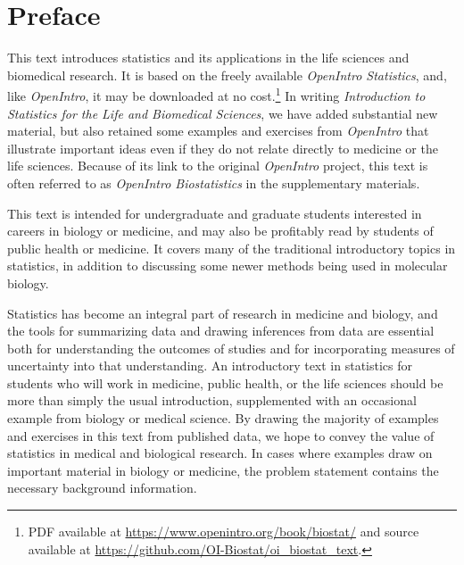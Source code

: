 

\chapter*{Preface}

This text introduces statistics and its applications in the life sciences and biomedical research.  It is based on the freely available \textit{OpenIntro Statistics}, and, like \textit{OpenIntro}, it may be downloaded at no cost.\footnote{PDF available at \url{https://www.openintro.org/book/biostat/} and source available at \url{https://github.com/OI-Biostat/oi_biostat_text}.}  In writing \textit{Introduction to Statistics for the Life and Biomedical Sciences}, we have added substantial new material, but also retained some examples and exercises from \textit{OpenIntro} that illustrate important ideas even if they do not relate directly to medicine or the life sciences. Because of its link to the original \textit{OpenIntro} project, this text is often referred to as \textit{OpenIntro Biostatistics} in the supplementary materials.

This text is intended for undergraduate and graduate students interested in careers in biology or medicine, and may also be profitably read by students of public health or medicine.  It covers many of the traditional introductory topics in statistics, in addition to discussing some newer methods being used in molecular biology. 

Statistics has become an integral part of research in medicine and biology, and the tools for summarizing data and drawing inferences from data are essential both for understanding the outcomes of studies and for incorporating measures of uncertainty into that understanding.  An introductory text in statistics for students who will work in medicine, public health, or the life sciences should be more than simply the usual introduction, supplemented with an occasional example from biology or medical science. By drawing the majority of examples and exercises in this text from published data, we hope to convey the value of statistics in medical and biological research. In cases where examples draw on important material in biology or medicine, the problem statement contains the necessary background information. 

